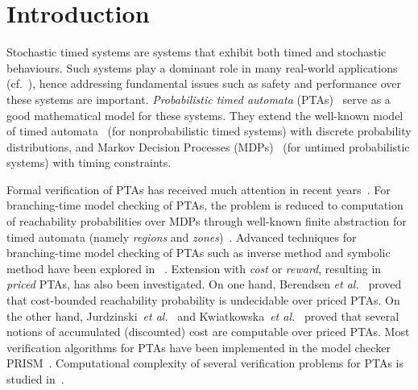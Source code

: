 \section{Introduction}
Stochastic timed systems are systems that exhibit both timed and stochastic behaviours.
Such systems play a dominant role in many real-world applications (cf.~\cite{DBLP:books/daglib/0020348}), hence
addressing fundamental issues such as safety and performance over these systems are important.
\emph{Probabilistic timed automata} (PTAs)~\cite{DBLP:journals/fmsd/NormanPS13,DBLP:journals/tcs/Beauquier03,DBLP:journals/tcs/KwiatkowskaNSS02} serve as a good mathematical model for these systems.
They extend the well-known model of timed automata~\cite{DBLP:journals/tcs/AlurD94} (for nonprobabilistic timed systems) with discrete probability distributions, and Markov Decision Processes (MDPs)~\cite{PutermanMDP} (for untimed probabilistic systems) with timing constraints.

Formal verification of PTAs has received much attention in recent years~\cite{DBLP:journals/fmsd/NormanPS13}.
For branching-time model checking of PTAs, the problem is reduced to computation of reachability probabilities over MDPs through well-known finite abstraction for timed automata (namely \emph{regions} and \emph{zones})~\cite{JensenPTA,DBLP:journals/tcs/Beauquier03,DBLP:journals/tcs/KwiatkowskaNSS02}.
Advanced techniques for branching-time model checking of PTAs such as inverse method and symbolic method have been explored in  ~\cite{DBLP:journals/fmsd/AndreFS13,DBLP:journals/iandc/KwiatkowskaNSW07,DBLP:conf/formats/KwiatkowskaNP09,DBLP:conf/formats/JovanovicKN15}.
Extension with \emph{cost} or \emph{reward}, resulting in \emph{priced} PTAs, has also been investigated.
On one hand, Berendsen \emph{et al.}~\cite{DBLP:conf/tamc/BerendsenCJ09} proved that cost-bounded reachability probability is undecidable over priced PTAs.
On the other hand, Jurdzinski~\emph{et al.}~\cite{DBLP:conf/concur/JurdzinskiKNT09} and Kwiatkowska~\emph{et al.}~\cite{DBLP:journals/fmsd/KwiatkowskaNPS06} proved that several notions of accumulated (discounted) cost are computable over priced PTAs.
Most verification algorithms for PTAs have been implemented in the model checker PRISM~\cite{DBLP:conf/cav/KwiatkowskaNP11}. Computational complexity of several verification problems for PTAs is studied in~\cite{DBLP:journals/ipl/LaroussinieS07,DBLP:journals/lmcs/JurdzinskiSL08,DBLP:conf/concur/JurdzinskiKNT09}.


